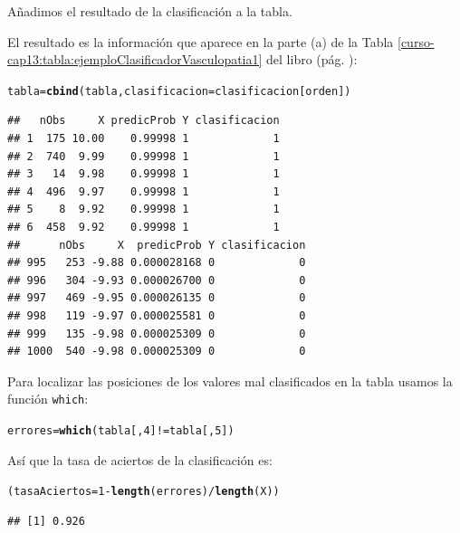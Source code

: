 \documentclass[10pt,a4paper]{article}\usepackage[]{graphicx}\usepackage[]{color}
\makeatletter
\newcommand{\hlnum}[1]{\textcolor[rgb]{0.686,0.059,0.569}{#1}}%
\newcommand{\hlopt}[1]{\textcolor[rgb]{0,0,0}{#1}}%
\newcommand{\hlstd}[1]{\textcolor[rgb]{0.345,0.345,0.345}{#1}}%
\newcommand{\hlkwb}[1]{\textcolor[rgb]{0.69,0.353,0.396}{#1}}%
\newcommand{\hlkwc}[1]{\textcolor[rgb]{0.333,0.667,0.333}{#1}}%
\newcommand{\hlkwd}[1]{\textcolor[rgb]{0.737,0.353,0.396}{\textbf{#1}}}%
\newenvironment{kframe}{%
 \def\at@end@of@kframe{}%
 \ifinner\ifhmode%
  \def\at@end@of@kframe{\end{minipage}}%
  \begin{minipage}{\columnwidth}%
 \fi\fi%
 \def\FrameCommand##1{\hskip\@totalleftmargin \hskip-\fboxsep
 \colorbox{shadecolor}{##1}\hskip-\fboxsep
     \hskip-\linewidth \hskip-\@totalleftmargin \hskip\columnwidth}%
 \MakeFramed {\advance\hsize-\width
   \@totalleftmargin\z@ \linewidth\hsize
   \@setminipage}}%
 {\par\unskip\endMakeFramed%
 \at@end@of@kframe}
\newenvironment{knitrout}{}{} %
\makeatother
\begin{document}
Añadimos el resultado de la clasificación a la tabla.

El resultado es la información que aparece en la parte (a) de la Tabla \ref{curso-cap13:tabla:ejemploClasificadorVasculopatia1} del libro (pág. \pageref{curso-cap13:tabla:ejemploClasificadorVasculopatia1}):

\begin{knitrout}
\color{fgcolor}\begin{kframe}
\begin{alltt}
\hlstd{tabla} \hlkwb{=} \hlkwd{cbind}\hlstd{(tabla,} \hlkwc{clasificacion} \hlstd{= clasificacion[orden])}
\end{alltt}
\begin{verbatim}
##   nObs     X predicProb Y clasificacion
## 1  175 10.00    0.99998 1             1
## 2  740  9.99    0.99998 1             1
## 3   14  9.98    0.99998 1             1
## 4  496  9.97    0.99998 1             1
## 5    8  9.92    0.99998 1             1
## 6  458  9.92    0.99998 1             1
##      nObs     X  predicProb Y clasificacion
## 995   253 -9.88 0.000028168 0             0
## 996   304 -9.93 0.000026700 0             0
## 997   469 -9.95 0.000026135 0             0
## 998   119 -9.97 0.000025581 0             0
## 999   135 -9.98 0.000025309 0             0
## 1000  540 -9.98 0.000025309 0             0
\end{verbatim}
\end{kframe}
\end{knitrout}




Para localizar las posiciones de los valores mal clasificados en la tabla usamos la función {\tt which}:

\begin{knitrout}
\color{fgcolor}\begin{kframe}
\begin{alltt}
\hlstd{errores} \hlkwb{=} \hlkwd{which}\hlstd{(tabla[ ,} \hlnum{4}\hlstd{]} \hlopt{!=} \hlstd{tabla[ ,} \hlnum{5}\hlstd{] )}
\end{alltt}
\end{kframe}
\end{knitrout}

Así que la tasa de aciertos de la clasificación es:


\begin{knitrout}
\color{fgcolor}\begin{kframe}
\begin{alltt}
\hlstd{(tasaAciertos} \hlkwb{=} \hlnum{1} \hlopt{-} \hlkwd{length}\hlstd{(errores)} \hlopt{/} \hlkwd{length}\hlstd{(X))}
\end{alltt}
\begin{verbatim}
## [1] 0.926
\end{verbatim}
\end{kframe}
\end{knitrout}
\end{document}
